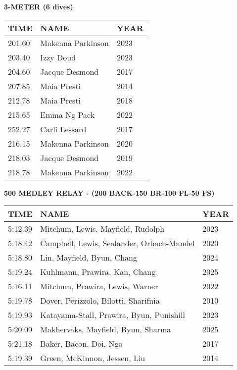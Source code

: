 \begin{center}
\begin{minipage}[t]{0.7\textwidth}
\centering
\textbf{3-METER (6 dives)}\\[0.05cm]
\begin{tabular}{@{}p{1.8cm}p{2.8cm}p{1.2cm}@{}}
\hline
\textbf{TIME} & \textbf{NAME} & \textbf{YEAR} \\
\hline
201.60 & Makenna Parkinson & 2023 \\
203.40 & Izzy Doud & 2023 \\
204.60 & Jacque Desmond & 2017 \\
207.85 & Maia Presti & 2014 \\
212.78 & Maia Presti & 2018 \\
215.65 & Emma Ng Pack & 2022 \\
252.27 & Carli Lessard & 2017 \\
216.15 & Makenna Parkinson & 2020 \\
218.03 & Jacque Desmond & 2019 \\
218.78 & Makenna Parkinson & 2022 \\
\hline
\end{tabular}
\end{minipage}
\end{center}

\vspace{0.4cm}

\begin{center}
\begin{minipage}[t]{0.7\textwidth}
\centering
\textbf{500 MEDLEY RELAY - (200 BACK-150 BR-100 FL-50 FS)}\\[0.05cm]
\begin{tabular}{@{}p{1.8cm}p{2.8cm}p{1.2cm}@{}}
\hline
\textbf{TIME} & \textbf{NAME} & \textbf{YEAR} \\
\hline
5:12.39 & Mitchum, Lewis, Mayfield, Rudolph & 2023 \\
5:18.42 & Campbell, Lewis, Sealander, Orbach-Mandel & 2020 \\
5:18.80 & Lin, Mayfield, Byun, Chang & 2024 \\
5:19.24 & Kuhlmann, Prawira, Kan, Chang & 2025 \\
5:16.11 & Mitchum, Prawira, Lewis, Warner & 2022 \\
5:19.78 & Dover, Perizzolo, Bilotti, Sharifnia & 2010 \\
5:19.93 & Katayama-Stall, Prawira, Byun, Punishill & 2023 \\
5:20.09 & Makhervaks, Mayfield, Byun, Sharma & 2025 \\
5:21.18 & Baker, Bacon, Doi, Ngo & 2017 \\
5:19.39 & Green, McKinnon, Jessen, Liu & 2014 \\
\hline
\end{tabular}
\end{minipage}
\end{center}


